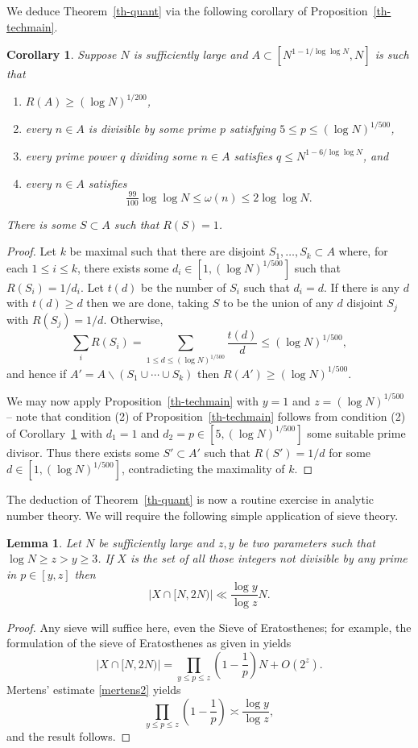 \documentclass[12pt]{amsart}
\newcommand{\abs}[1]{\left\lvert #1\right\rvert}
\newcommand{\brac}[1]{\left( #1\right)}
\newtheorem{lemma}{Lemma}
\newtheorem{corollary}{Corollary}
\begin{document}
We deduce Theorem~\ref{th-quant} via the following corollary of Proposition~\ref{th-techmain}.
\begin{corollary}\label{cor-techmain}
Suppose $N$ is sufficiently large and $A\subset [N^{1-1/\log\log N},N]$ is such that
\begin{enumerate}
\item $R(A)\geq (\log N)^{1/200}$,
\item every $n\in A$ is divisible by some prime $p$ satisfying $5 \leq p \leq (\log N)^{1/500}$,
\item every prime power $q$ dividing some $n\in A$ satisfies $q\leq N^{1-6/\log\log N}$, and
\item every $n\in A$ satisfies
\[\tfrac{99}{100}\log\log N\leq \omega(n) \leq 2\log\log N.\]
\end{enumerate}
There is some $S\subset A$ such that $R(S)=1$.
\end{corollary}
\begin{proof}
Let $k$ be maximal such that there are disjoint $S_1,\ldots,S_k\subset A$ where, for each $1\leq i\leq k$, there exists some $d_i\in [1,(\log N)^{1/500}]$ such that $R(S_i)=1/d_i$. Let $t(d)$ be the number of $S_i$ such that $d_i=d$. If there is any $d$ with $t(d)\geq d$ then we are done, taking $S$ to be the union of any $d$ disjoint $S_j$ with $R(S_j)=1/d$. Otherwise,
\[\sum_i R(S_i)= \sum_{1\leq d\leq (\log N)^{1/500}} \frac{t(d)}{d}\leq (\log N)^{1/500},\]
and hence if $A'=A\backslash (S_1\cup\cdots \cup S_k)$ then $R(A')\geq (\log N)^{1/500}$. 

We may now apply Proposition~\ref{th-techmain} with $y=1$ and $z=(\log N)^{1/500}$ -- note that condition (2) of Proposition~\ref{th-techmain} follows from condition (2) of Corollary~\ref{cor-techmain} with $d_1=1$ and $d_2=p\in [5,(\log N)^{1/500}]$ some suitable prime divisor. Thus there exists some $S'\subset A'$ such that $R(S')=1/d$ for some $d\in [1,(\log N)^{1/500}]$, contradicting the maximality of $k$.
\end{proof}

The deduction of Theorem~\ref{th-quant} is now a routine exercise in analytic number theory. We will require the following simple application of sieve theory. 

\begin{lemma}\label{lem-sieve1}
Let $N$ be sufficiently large and $z,y$ be two parameters such that $\log N \geq z>y\geq 3$. If $X$ is the set of all those integers not divisible by any prime in $p\in [y,z]$ then
\[\abs{ X\cap [N,2N)}\ll \frac{\log y}{\log z}N.\]
\end{lemma}
\begin{proof}
Any sieve will suffice here, even the Sieve of Eratosthenes; for example, the formulation of the sieve of Eratosthenes as given in \cite[Theorem 3.1]{MV} yields 
\[\abs{X\cap [N,2N)} = \prod_{y\leq p\leq z}\brac{1-\frac{1}{p}}N+ O(2^z).\]
Mertens' estimate \eqref{mertens2} yields
\[\prod_{y\leq p\leq z}\brac{1-\frac{1}{p}}\asymp \frac{\log y}{\log z},\]
and the result follows. 
\end{proof}
\end{document}

